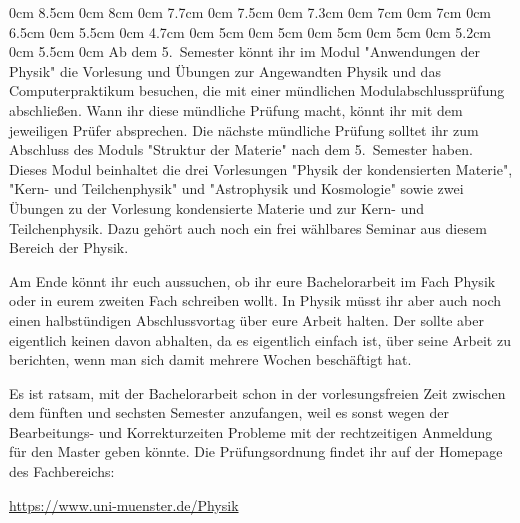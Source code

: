 \begin{multicols*}{2}
0cm 8.5cm
0cm 8cm
0cm 7.7cm
0cm 7.5cm
0cm 7.3cm
0cm 7cm
0cm 7cm
0cm 6.5cm
0cm 5.5cm
0cm 4.7cm
0cm 5cm
0cm 5cm
0cm 5cm
0cm 5cm
0cm 5.2cm
0cm 5.5cm
0cm \columnwidth
Ab dem 5.~Semester könnt ihr im Modul "Anwendungen der Physik" die Vorlesung und Übungen zur Angewandten Physik und das Computerpraktikum besuchen, die mit einer mündlichen Modulabschlussprüfung abschließen. Wann ihr diese mündliche Prüfung macht, könnt ihr mit dem jeweiligen Prüfer absprechen. Die nächste mündliche Prüfung solltet ihr zum Abschluss des Moduls "Struktur der Materie" nach dem 5.~Semester haben. Dieses Modul beinhaltet die drei Vorlesungen "Physik der kondensierten Materie", "Kern- und Teilchenphysik" und "Astrophysik und Kosmologie" sowie zwei Übungen zu der Vorlesung kondensierte Materie und zur Kern- und Teilchenphysik. Dazu gehört auch noch ein frei wählbares Seminar aus diesem Bereich der Physik.

Am Ende könnt ihr euch aussuchen, ob ihr eure Bachelorarbeit im Fach Physik oder in eurem zweiten Fach schreiben wollt. In Physik müsst ihr aber auch noch einen halbstündigen Abschlussvortag über eure Arbeit halten. Der sollte aber eigentlich keinen davon abhalten, da es eigentlich einfach ist, über seine Arbeit zu berichten, wenn man sich damit mehrere Wochen beschäftigt hat.

Es ist ratsam, mit der Bachelorarbeit schon in der vorlesungsfreien Zeit zwischen dem fünften und sechsten Semester anzufangen, weil es sonst wegen der Bearbeitungs- und Korrekturzeiten Probleme mit der rechtzeitigen Anmeldung für den Master geben könnte. Die Prüfungsordnung findet ihr auf der Homepage des Fachbereichs:
\begin{center}
\url{https://www.uni-muenster.de/Physik}
\end{center}


\end{multicols*}
